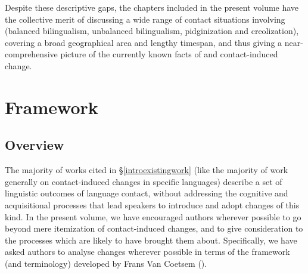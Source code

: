 \documentclass[output=paper]{langsci/langscibook}
\begin{document}
Despite these descriptive gaps, the chapters included in the present volume have the collective merit of discussing a wide range of contact situations involving  (balanced {bilingualism}, unbalanced {bilingualism}, pidginization and creolization), covering a broad geographical area and lengthy timespan, and thus giving a near-comprehensive picture of the currently known facts of  and contact-induced change.

\section{Framework}\label{introvc}
\subsection{Overview}\label{introvcoverview}
The majority of works cited in §\ref{introexistingwork} (like the majority of work generally on contact-induced changes in specific languages) describe a set of linguistic outcomes of language contact, without addressing the cognitive and acquisitional processes that lead speakers to introduce and adopt changes of this kind. In the present volume, we have encouraged authors wherever possible to go beyond mere itemization of contact-induced changes, and to give consideration to the processes which are likely to have brought them about. Specifically, we have asked authors to analyse changes wherever possible in terms of the framework (and terminology) developed by Frans Van Coetsem (\citeyear{VanCoetsem1988,VanCoetsem2000}).
\end{document}
